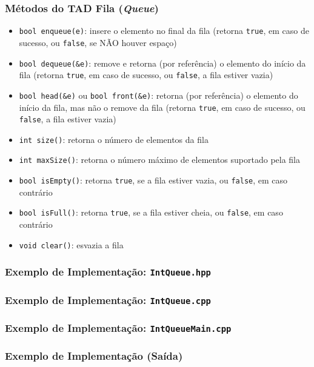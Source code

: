 \documentclass[aspectratio=169]{beamer}
\begin{document}
\begin{frame}\frametitle{Métodos do TAD Fila (\emph{Queue})}
\begin{itemize}
	\item \texttt{bool enqueue(e)}: insere o elemento no final da fila (retorna \texttt{true}, em caso de sucesso, ou \texttt{false}, se NÃO houver espaço)
	\item \texttt{bool dequeue(\&e)}: remove e retorna (por referência) o elemento do início da fila (retorna \texttt{true}, em caso de sucesso, ou \texttt{false}, a fila estiver vazia)
	\item \texttt{bool head(\&e)} ou \texttt{bool front(\&e)}: retorna (por referência) o elemento do início da fila, mas não o remove da fila (retorna \texttt{true}, em caso de sucesso, ou \texttt{false}, a fila estiver vazia)
	\item \texttt{int size()}: retorna o número de elementos da fila
	\item \texttt{int maxSize()}: retorna o número máximo de elementos suportado pela fila
	\item \texttt{bool isEmpty()}: retorna \texttt{true}, se a fila estiver vazia, ou \texttt{false}, em caso contrário
	\item \texttt{bool isFull()}: retorna \texttt{true}, se a fila estiver cheia, ou \texttt{false}, em caso contrário
	\item \texttt{void clear()}: esvazia a fila
\end{itemize}
\end{frame}

\begin{frame}\frametitle{Exemplo de Implementação: \texttt{IntQueue.hpp}}

\end{frame}

\begin{frame}\frametitle{Exemplo de Implementação: \texttt{IntQueue.cpp}}
\fontsize{3pt}{5pt}\selectfont{

}
\end{frame}

\begin{frame}\frametitle{Exemplo de Implementação: \texttt{IntQueueMain.cpp}}
\fontsize{5pt}{6pt}\selectfont{

}
\end{frame}
\begin{frame}\frametitle{Exemplo de Implementação (Saída)}

\end{frame}
\end{document}
